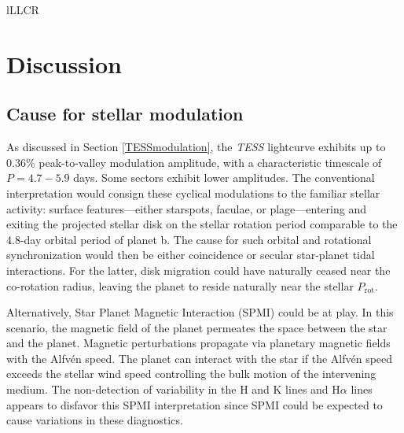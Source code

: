 \documentclass[twocolumn]{aastex631}
\begin{document}
\begin{deluxetable}{lLLCR}
    \tablewidth{0pc}
    \tabletypesize{\scriptsize}
    \startdata
    
    \enddata
\end{deluxetable}

\section{Discussion}\label{secDiscuss}

\subsection{Cause for stellar modulation}
As discussed in Section \ref{TESSmodulation}, the \emph{TESS} lightcurve exhibits up to $0.36\%$ peak-to-valley modulation amplitude, with a characteristic timescale of $P=4.7-5.9$ days. Some sectors exhibit lower amplitudes.  The conventional interpretation would consign these cyclical modulations to the familiar stellar activity: surface features---either starspots, faculae, or plage---entering and exiting the projected stellar disk on the stellar rotation period comparable to the 4.8-day orbital period of planet b.  The cause for such orbital and rotational synchronization would then be either coincidence or secular star-planet tidal interactions.  For the latter, disk migration could have naturally ceased near the co-rotation radius, leaving the planet to reside naturally near the stellar $P_\mathrm{rot}$.  

Alternatively, Star Planet Magnetic Interaction (SPMI) could be at play.  In this scenario, the magnetic field of the planet permeates the space between the star and the planet.  Magnetic perturbations propagate via planetary magnetic fields with the Alfv\'en speed.  The planet can interact with the star if the Alfv\'en speed exceeds the stellar wind speed controlling the bulk motion of the intervening medium.  The non-detection of variability in the  H and K lines and H$\alpha$ lines appears to disfavor this SPMI interpretation since SPMI could be expected to cause variations in these diagnostics.
\end{document}

